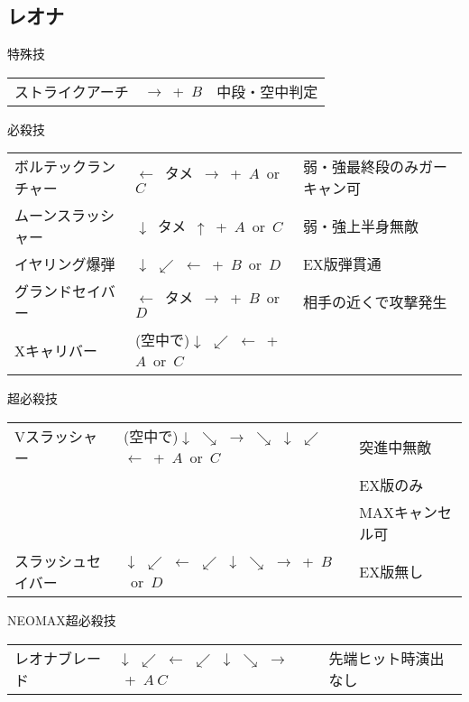 \documentclass[a4j,11pt]{jarticle}
\def\vtame{$\downarrow$\ タメ\ $\uparrow$}
\def\htame{$\leftarrow$\ タメ\ $\rightarrow$}
\def\tatsu{$\downarrow$ $\swarrow$ $\leftarrow$}%
\def\ryuko{$\downarrow$ $\searrow$ $\rightarrow$ $\searrow$ $\downarrow$ $\swarrow$ $\leftarrow$}%
\def\orochi{$\downarrow$ $\swarrow$ $\leftarrow$ $\swarrow$ $\downarrow$ $\searrow$ $\rightarrow$}%
\begin{document}
\subsection{レオナ}
\begin{itembox}[l]{特殊技}
\begin{tabular}{lll}
ストライクアーチ&$\rightarrow$\ +\ $B$&中段・空中判定\\
\end{tabular}
\end{itembox}
\begin{itembox}[l]{必殺技}
\begin{tabular}{lll}
ボルテックランチャー&\htame\ +\ $A$\ or\ $C$&弱・強最終段のみガーキャン可\\
ムーンスラッシャー&\vtame\ +\ $A$\ or\ $C$&弱・強上半身無敵\\
イヤリング爆弾&\tatsu\ +\ $B$\ or\ $D$&EX版弾貫通\\
グランドセイバー&\htame\ +\ $B$\ or\ $D$&相手の近くで攻撃発生\\
Xキャリバー&(空中で)\tatsu\ +\ $A$\ or\ $C$&
\end{tabular}
\end{itembox}
\begin{itembox}[l]{超必殺技}
\begin{tabular}{lll}
Vスラッシャー&(空中で)\ryuko\ +\ $A$\ or\ $C$&突進中無敵\\
&&EX版のみ\\
&&MAXキャンセル可\\
スラッシュセイバー&\orochi\ +\ $B$\ or\ $D$&EX版無し
\end{tabular}
\end{itembox}
\begin{itembox}[l]{NEOMAX超必殺技}
\begin{tabular}{lll}
レオナブレード&\orochi\ +\ $A\ C$&先端ヒット時演出なし
\end{tabular}
\end{itembox}
\newpage
\end{document}
